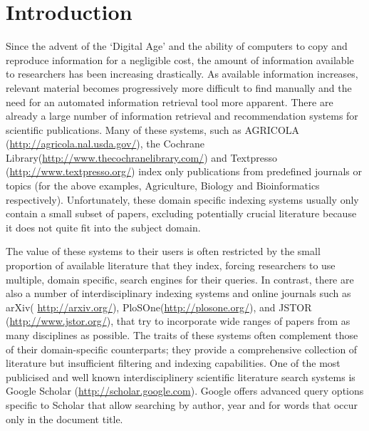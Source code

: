 \documentclass{svmult}
\begin{document}
\section{Introduction} \label{sec:1} Since the advent of the `Digital Age' and
the ability of computers to copy and reproduce information for a negligible
cost, the amount of information available to researchers has been increasing
drastically. As available information increases, relevant material becomes
progressively more difficult to find manually and the need for an automated
information retrieval tool more apparent. There are already a large number of
information retrieval and recommendation systems for scientific publications.
Many of these systems, such as AGRICOLA (\url{http://agricola.nal.usda.gov/}),
the Cochrane Library(\url{http://www.thecochranelibrary.com/}) and Textpresso
(\url{http://www.textpresso.org/}) index only publications from predefined
journals or topics (for the above examples, Agriculture, Biology and
Bioinformatics respectively).  Unfortunately, these domain specific indexing
systems usually only contain a small subset of papers, excluding potentially
crucial literature because it does not quite fit into the subject domain. 

The value of these systems to their users is often restricted by the small
proportion of available literature that they index, forcing researchers to use
multiple, domain specific, search engines for their queries.  In contrast,
there are also a number of interdisciplinary indexing systems and online
journals such as arXiv( \url{http://arxiv.org/}),
PloSOne(\url{http://plosone.org/}), and JSTOR (\url{http://www.jstor.org/}),
that try to incorporate wide ranges of papers from as many disciplines as
possible. The traits of these systems often complement those of their
domain-specific counterparts; they provide a comprehensive collection of
literature but insufficient filtering and indexing capabilities.  One of the
most publicised and well known interdisciplinery scientific literature search
systems is Google Scholar (\url{http://scholar.google.com}). Google offers
advanced query options specific to Scholar that allow searching by author, year
and for words that occur only in the document title.
\end{document}
